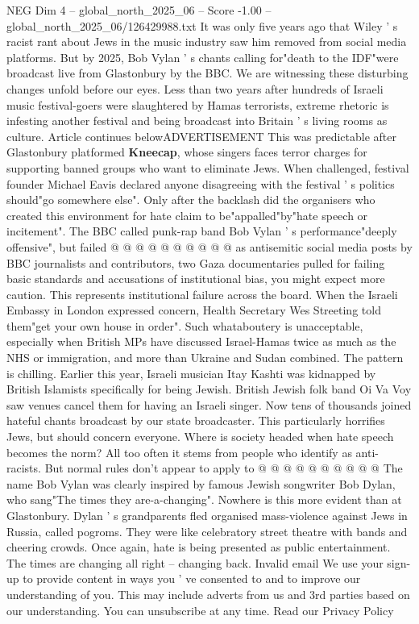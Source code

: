 \begin{textsample}{NEG Dim 4 – global\_north\_2025\_06 – Score -1.00 – global\_north\_2025\_06/126429988.txt}  \label{ex:f4_neg_062}
It was only five years ago that Wiley ' s racist rant about Jews in the music industry saw him removed from social media platforms.
But by 2025, Bob Vylan ' s chants calling for"death to the IDF"were broadcast live from Glastonbury by the BBC.
We are witnessing these disturbing changes unfold before our eyes.
Less than two years after hundreds of Israeli music festival-goers were slaughtered by Hamas terrorists, extreme rhetoric is infesting another festival and being broadcast into Britain ' s living rooms as culture.
Article continues belowADVERTISEMENT This was predictable after Glastonbury platformed \textbf{Kneecap}, whose singers faces terror charges for supporting banned groups who want to eliminate Jews.
When challenged, festival founder Michael Eavis declared anyone disagreeing with the festival ' s politics should"go somewhere else".
Only after the backlash did the organisers who created this environment for hate claim to be"appalled"by"hate speech or incitement".
The BBC called punk-rap band Bob Vylan ' s performance"deeply offensive", but failed @ @ @ @ @ @ @ @ @ @ as antisemitic social media posts by BBC journalists and contributors, two Gaza documentaries pulled for failing basic standards and accusations of institutional bias, you might expect more caution.
This represents institutional failure across the board.
When the Israeli Embassy in London expressed concern, Health Secretary Wes Streeting told them"get your own house in order".
Such whataboutery is unacceptable, especially when British MPs have discussed Israel-Hamas twice as much as the NHS or immigration, and more than Ukraine and Sudan combined.
The pattern is chilling.
Earlier this year, Israeli musician Itay Kashti was kidnapped by British Islamists specifically for being Jewish.
British Jewish folk band Oi Va Voy saw venues cancel them for having an Israeli singer.
Now tens of thousands joined hateful chants broadcast by our state broadcaster.
This particularly horrifies Jews, but should concern everyone.
Where is society headed when hate speech becomes the norm?
All too often it stems from people who identify as anti-racists.
But normal rules don't appear to apply to @ @ @ @ @ @ @ @ @ @ The name Bob Vylan was clearly inspired by famous Jewish songwriter Bob Dylan, who sang"The times they are-a-changing".
Nowhere is this more evident than at Glastonbury.
Dylan ' s grandparents fled organised mass-violence against Jews in Russia, called pogroms.
They were like celebratory street theatre with bands and cheering crowds.
Once again, hate is being presented as public entertainment.
The times are changing all right -- changing back.
Invalid email We use your sign-up to provide content in ways you ' ve consented to and to improve our understanding of you.
This may include adverts from us and 3rd parties based on our understanding.
You can unsubscribe at any time.
Read our Privacy Policy

\end{textsample}

